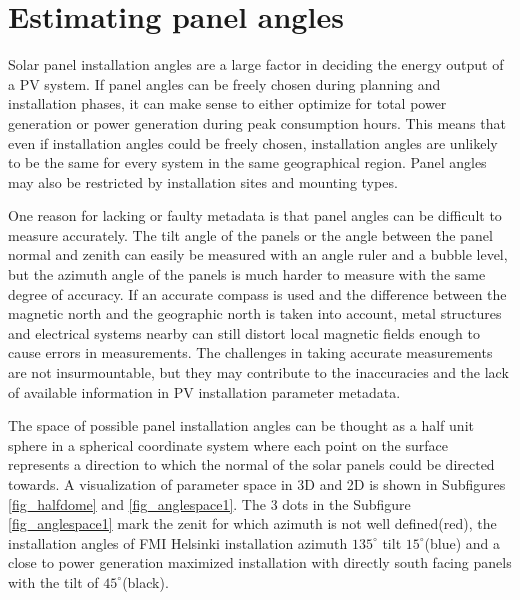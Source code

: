 \chapter{Estimating panel angles}
Solar panel installation angles are a large factor in deciding the energy output of a PV system. If panel angles can be freely chosen during planning and installation phases, it can make sense to either optimize for total power generation or power generation during peak consumption hours. This means that even if installation angles could be freely chosen, installation angles are unlikely to be the same for every system in the same geographical region. Panel angles may also be restricted by installation sites and mounting types. 


One reason for lacking or faulty metadata is that panel angles can be difficult to measure accurately. The tilt angle of the panels or the angle between the panel normal and zenith can easily be measured with an angle ruler and a bubble level, but the azimuth angle of the panels is much harder to measure with the same degree of accuracy. If an accurate compass is used and the difference between the magnetic north and the geographic north is taken into account, metal structures and electrical systems nearby can still distort local magnetic fields enough to cause errors in measurements. The challenges in taking accurate measurements are not insurmountable, but they may contribute to the inaccuracies and the lack of available information in PV installation parameter metadata. 

The space of possible panel installation angles can be thought as a half unit sphere in a spherical coordinate system where each point on the surface represents a direction to which the normal of the solar panels could be directed towards. A visualization of parameter space in 3D and 2D is shown in Subfigures \ref{fig_halfdome} and \ref{fig_anglespace1}. The 3 dots in the Subfigure \ref{fig_anglespace1} mark the zenit for which azimuth is not well defined(red), the installation angles of FMI Helsinki installation azimuth $135^\circ$ tilt $15^\circ$(blue) and a close to power generation maximized installation with directly south facing panels with the tilt of $45^\circ$(black).


